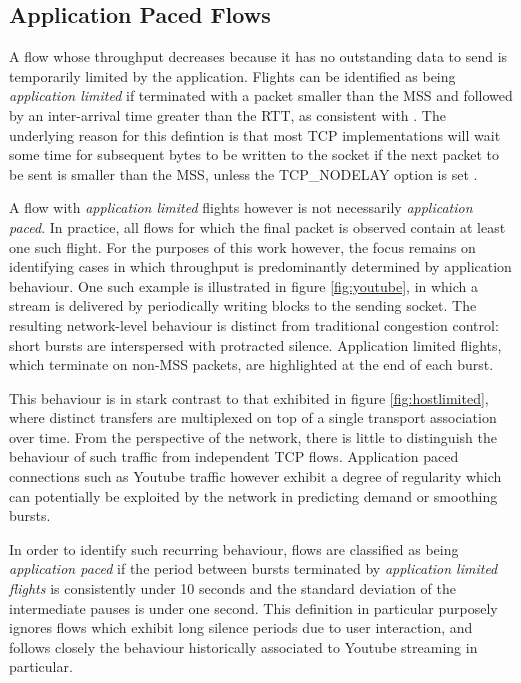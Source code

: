 \subsection{Application Paced Flows}
\label{section:rate:app}

A flow whose throughput decreases because it has no outstanding data to send is temporarily limited by the application. 
Flights can be identified as being \emph{application limited} if terminated with a packet smaller than the \ac{MSS} and followed by an inter-arrival time greater than the \ac{RTT}, as consistent with \cite{Zhang:2002p85}. 
The underlying reason for this defintion is that most \ac{TCP} implementations will wait some time for subsequent bytes to be written to the socket if the next packet to be sent is smaller than the \ac{MSS}, unless the \ac{TCP}\_NODELAY option is set \cite{nagle1984rfc}.

A flow with \emph{application limited} flights however is not necessarily \emph{application paced}. 
In practice, all flows for which the final packet is observed contain at least one such flight.
For the purposes of this work however, the focus remains on identifying cases in which throughput is predominantly determined by application behaviour.
One such example is illustrated in figure \ref{fig:youtube}, in which a stream is delivered by periodically writing blocks to the sending socket.
The resulting network-level behaviour is distinct from traditional congestion control: short bursts are interspersed with protracted silence.
Application limited flights, which terminate on non-\ac{MSS} packets, are highlighted at the end of each burst.

This behaviour is in stark contrast to that exhibited in figure \ref{fig:hostlimited}, where distinct transfers are multiplexed on top of a single transport association over time.
From the perspective of the network, there is little to distinguish the behaviour of such traffic from independent \ac{TCP} flows.
Application paced connections such as Youtube traffic however exhibit a degree of regularity which can potentially be exploited by the network in predicting demand or smoothing bursts.

In order to identify such recurring behaviour, flows are classified as being \emph{application paced} if the period between bursts terminated by \emph{application limited flights} is consistently under 10 seconds and the standard deviation of the intermediate pauses is under one second.
This definition in particular purposely ignores flows which exhibit long silence periods due to user interaction, and follows closely the behaviour historically associated to Youtube streaming in particular.

